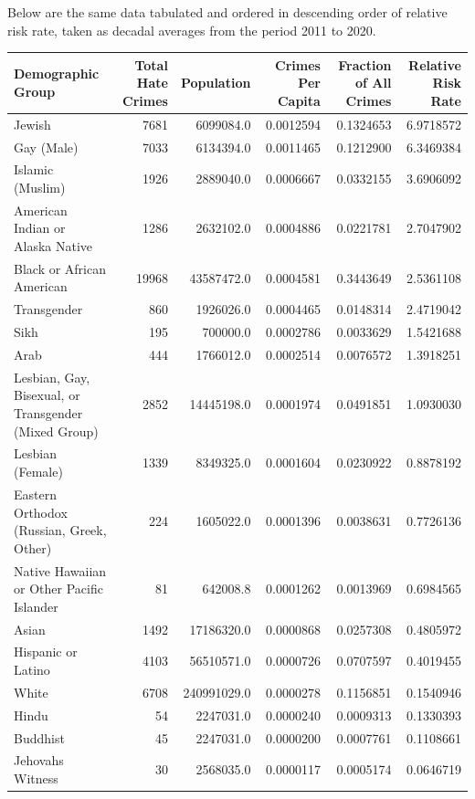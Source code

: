 \documentclass[
]{article}
\begin{document}
Below are the same data tabulated and ordered in descending order of
relative risk rate, taken as decadal averages from the period 2011 to
2020.

\begin{table}[H]
\centering
\begin{tabular}[t]{l|r|r|r|r|r}
\hline
Demographic Group & Total Hate Crimes & Population & Crimes Per Capita & Fraction of All Crimes & Relative Risk Rate\\
\hline
Jewish & 7681 & 6099084.0 & 0.0012594 & 0.1324653 & 6.9718572\\
\hline
Gay (Male) & 7033 & 6134394.0 & 0.0011465 & 0.1212900 & 6.3469384\\
\hline
Islamic (Muslim) & 1926 & 2889040.0 & 0.0006667 & 0.0332155 & 3.6906092\\
\hline
American Indian or Alaska Native & 1286 & 2632102.0 & 0.0004886 & 0.0221781 & 2.7047902\\
\hline
Black or African American & 19968 & 43587472.0 & 0.0004581 & 0.3443649 & 2.5361108\\
\hline
Transgender & 860 & 1926026.0 & 0.0004465 & 0.0148314 & 2.4719042\\
\hline
Sikh & 195 & 700000.0 & 0.0002786 & 0.0033629 & 1.5421688\\
\hline
Arab & 444 & 1766012.0 & 0.0002514 & 0.0076572 & 1.3918251\\
\hline
Lesbian, Gay, Bisexual, or Transgender (Mixed Group) & 2852 & 14445198.0 & 0.0001974 & 0.0491851 & 1.0930030\\
\hline
Lesbian (Female) & 1339 & 8349325.0 & 0.0001604 & 0.0230922 & 0.8878192\\
\hline
Eastern Orthodox (Russian, Greek, Other) & 224 & 1605022.0 & 0.0001396 & 0.0038631 & 0.7726136\\
\hline
Native Hawaiian or Other Pacific Islander & 81 & 642008.8 & 0.0001262 & 0.0013969 & 0.6984565\\
\hline
Asian & 1492 & 17186320.0 & 0.0000868 & 0.0257308 & 0.4805972\\
\hline
Hispanic or Latino & 4103 & 56510571.0 & 0.0000726 & 0.0707597 & 0.4019455\\
\hline
White & 6708 & 240991029.0 & 0.0000278 & 0.1156851 & 0.1540946\\
\hline
Hindu & 54 & 2247031.0 & 0.0000240 & 0.0009313 & 0.1330393\\
\hline
Buddhist & 45 & 2247031.0 & 0.0000200 & 0.0007761 & 0.1108661\\
\hline
Jehovahs Witness & 30 & 2568035.0 & 0.0000117 & 0.0005174 & 0.0646719\\

\end{tabular}
\end{table}
\end{document}
